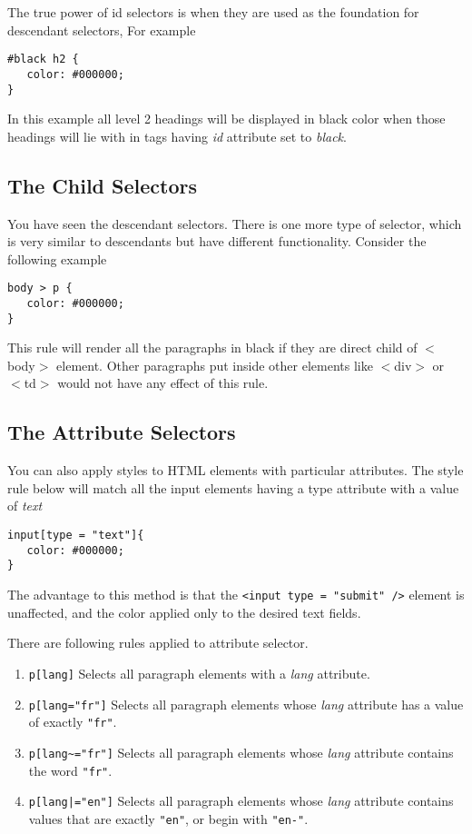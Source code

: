 \documentclass[a4paper,oneside]{book}
\numberwithin{equation}{chapter}
\begin{document}
The true power of id selectors is when they are used as the foundation for descendant selectors, For example
\begin{verbatim}
#black h2 {
   color: #000000; 
}
\end{verbatim}
In this example all level 2 headings will be displayed in black color when those headings will lie with in tags having \textit{id} attribute set to \textit{black}.
\subsection{The Child Selectors}
You have seen the descendant selectors. There is one more type of selector, which is very similar to descendants but have different functionality. Consider the following example
\begin{verbatim}
body > p {
   color: #000000; 
}
\end{verbatim}
This rule will render all the paragraphs in black if they are direct child of $<$body$>$ element. Other paragraphs put inside other elements like $<$div$>$ or $<$td$>$ would not have any effect of this rule.
\subsection{The Attribute Selectors}
You can also apply styles to HTML elements with particular attributes. The style rule below will match all the input elements having a type attribute with a value of \textit{text}
\begin{verbatim}
input[type = "text"]{
   color: #000000; 
}
\end{verbatim}
The advantage to this method is that the \verb|<input type = "submit" />| element is unaffected, and the color applied only to the desired text fields.

There are following rules applied to attribute selector.
\begin{enumerate}
\item \verb|p[lang]| Selects all paragraph elements with a \textit{lang} attribute.
\item \verb|p[lang="fr"]| Selects all paragraph elements whose \textit{lang} attribute has a value of exactly \verb|"fr"|.
\item \verb|p[lang~="fr"]| Selects all paragraph elements whose \textit{lang} attribute contains the word \verb|"fr"|.
\item \verb#p[lang|="en"]# Selects all paragraph elements whose \textit{lang} attribute contains values that are exactly \verb|"en"|, or begin with \verb|"en-"|.
\end{enumerate}
\end{document}

